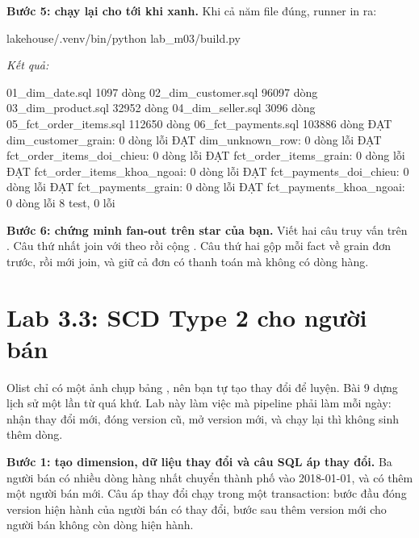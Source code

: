 \textbf{Bước 5: chạy lại cho tới khi xanh.} Khi cả năm file đúng, runner in ra:

\begin{codeblock}
lakehouse/.venv/bin/python lab_m03/build.py
\end{codeblock}
\textit{Kết quả:}
\begin{codeblock}
01_dim_date.sql               1097 dòng
02_dim_customer.sql          96097 dòng
03_dim_product.sql           32952 dòng
04_dim_seller.sql             3096 dòng
05_fct_order_items.sql      112650 dòng
06_fct_payments.sql         103886 dòng
ĐẠT  dim_customer_grain: 0 dòng lỗi
ĐẠT  dim_unknown_row: 0 dòng lỗi
ĐẠT  fct_order_items_doi_chieu: 0 dòng lỗi
ĐẠT  fct_order_items_grain: 0 dòng lỗi
ĐẠT  fct_order_items_khoa_ngoai: 0 dòng lỗi
ĐẠT  fct_payments_doi_chieu: 0 dòng lỗi
ĐẠT  fct_payments_grain: 0 dòng lỗi
ĐẠT  fct_payments_khoa_ngoai: 0 dòng lỗi
8 test, 0 lỗi
\end{codeblock}

\textbf{Bước 6: chứng minh fan-out trên star của bạn.} Viết hai câu truy vấn trên . Câu thứ nhất join  với  theo  rồi cộng . Câu thứ hai gộp mỗi fact về grain đơn trước, rồi mới join, và giữ cả đơn có thanh toán mà không có dòng hàng.


\section{Lab 3.3: SCD Type 2 cho người bán}

Olist chỉ có một ảnh chụp bảng , nên bạn tự tạo thay đổi để luyện. Bài 9 dựng lịch sử một lần từ quá khứ. Lab này làm việc mà pipeline phải làm mỗi ngày: nhận thay đổi mới, đóng version cũ, mở version mới, và chạy lại thì không sinh thêm dòng.

\textbf{Bước 1: tạo dimension, dữ liệu thay đổi và câu SQL áp thay đổi.} Ba người bán có nhiều dòng hàng nhất chuyển thành phố vào 2018-01-01, và có thêm một người bán mới. Câu áp thay đổi chạy trong một transaction: bước đầu đóng version hiện hành của người bán có thay đổi, bước sau thêm version mới cho người bán không còn dòng hiện hành.

